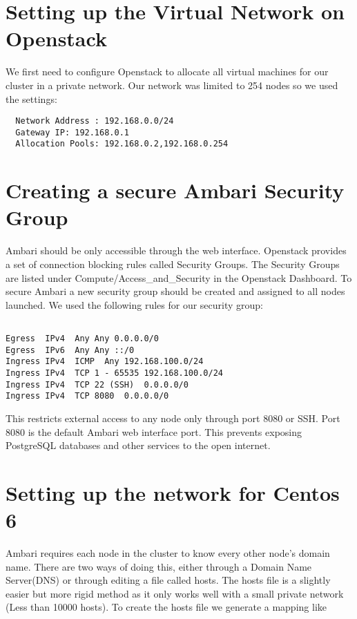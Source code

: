 \documentclass[9pt,twocolumn,twoside]{idsi}
\begin{document}
\section{Setting up the Virtual Network on Openstack}
We first need to configure Openstack to allocate all virtual machines for our cluster in a private network. Our network was limited to 254 nodes so we used the settings:

\begin{verbatim}
  Network Address : 192.168.0.0/24
  Gateway IP: 192.168.0.1
  Allocation Pools: 192.168.0.2,192.168.0.254
\end{verbatim}

\section{Creating a secure Ambari Security Group}
Ambari should be only accessible through the web interface. Openstack provides a set of connection blocking rules called Security Groups. The Security Groups are listed under Compute/Access\_and\_Security in the Openstack Dashboard. To secure Ambari a new security group should be created and assigned to all nodes launched. We used the following rules for our security group:

\begin{verbatim}

Egress  IPv4  Any Any 0.0.0.0/0
Egress  IPv6  Any Any ::/0 
Ingress IPv4  ICMP  Any 192.168.100.0/24 
Ingress IPv4  TCP 1 - 65535 192.168.100.0/24 
Ingress IPv4  TCP 22 (SSH)  0.0.0.0/0
Ingress IPv4  TCP 8080  0.0.0.0/0

\end{verbatim}

This restricts external access to any node only through port 8080 or SSH. Port 8080 is the default Ambari web interface port. This prevents exposing PostgreSQL databases and other services to the open internet. 

\section{Setting up the network for Centos 6}
\label{sec:network}

Ambari requires each node in the cluster to know every other node's domain name. There are two ways of doing this, either through a Domain Name Server(DNS) or through editing a file called hosts. The hosts file is a slightly easier but more rigid method as it only works well with a small private network (Less than 10000 hosts). To create the hosts file we generate a mapping like
\end{document}
